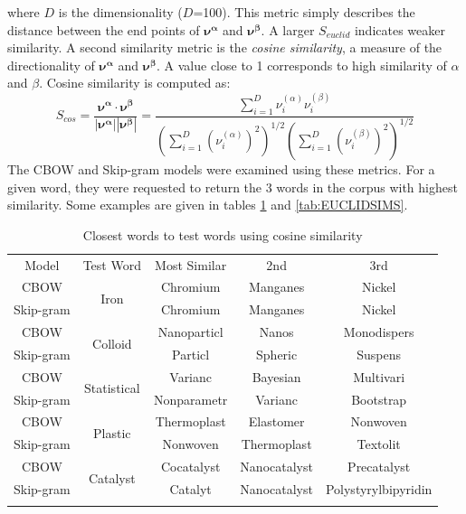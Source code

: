 where $D$ is the dimensionality ($D$=100). This metric simply describes the distance between the end points of $\mathbf{\nu^\alpha}$ and $\mathbf{\nu^\beta}$. A larger $S_{euclid}$ indicates weaker similarity. A second similarity metric is the \emph{cosine similarity}, a measure of the directionality of $\mathbf{\nu^\alpha}$ and $\mathbf{\nu^\beta}$. A value close to 1 corresponds to high similarity of $\alpha$ and $\beta$. Cosine similarity is computed as:
$$S_{cos}=\frac{\mathbf{\nu^\alpha} \cdot \mathbf{\nu^\beta}}{|\mathbf{\nu^\alpha}| |\mathbf{\nu^\beta}|} = \frac{\displaystyle\sum_{i=1}^{D} \nu^{(\alpha)}_{i}\nu^{(\beta)}_{i}}{\left(\displaystyle\sum_{i=1}^{D} (\nu^{(\alpha)}_{i})^2\right)^{1/2} \left(\displaystyle\sum_{i=1}^{D} (\nu^{(\beta)}_{i})^2\right)^{1/2}}
$$
The CBOW and Skip-gram models were examined using these metrics. For a given word, they were requested to return the 3 words in the corpus with highest similarity. Some examples are given in tables \ref{tab:COSINESIMS} and \ref{tab:EUCLIDSIMS}.
\begin{table}[h!]
\begin{center}
\caption[Word similarity examinations with cosine similarity]{Closest words to test words using cosine similarity}
\label{tab:COSINESIMS}
\begin{tabular}{||c||c|c|c|c||}
\hline
Model     & Test Word              & Most Similar & 2nd & 3rd \\ \hhline{||=||=|=|=|=||}
CBOW      & \multirow{2}{*}{Iron} & Chromium             &  Manganes   &   Nickel  \\ \cline{1-1} \cline{3-5} 
Skip-gram &                   &  Chromium            &   Manganes  &  Nickel   \\ 
\hhline{||=||=|=|=|=||}
CBOW      & \multirow{2}{*}{Colloid} & Nanoparticl             &  Nanos   &   Monodispers  \\ \cline{1-1} \cline{3-5} 
Skip-gram &                   &  Particl            &   Spheric  &  Suspens   \\ 
\hhline{||=||=|=|=|=||}
CBOW      & \multirow{2}{*}{Statistical} & Varianc             &  Bayesian   &   Multivari  \\ \cline{1-1} \cline{3-5} 
Skip-gram &                   &  Nonparametr            &   Varianc  &  Bootstrap   \\ 
\hhline{||=||=|=|=|=||}
CBOW      & \multirow{2}{*}{Plastic} & Thermoplast             &  Elastomer   & Nonwoven    \\ \cline{1-1} \cline{3-5} 
Skip-gram &                   &  Nonwoven            &   Thermoplast  &  Textolit   \\ 
\hhline{||=||=|=|=|=||}
CBOW      & \multirow{2}{*}{Catalyst} & Cocatalyst             &  Nanocatalyst   & Precatalyst    \\ \cline{1-1} \cline{3-5} 
Skip-gram &                   &  Catalyt            &   Nanocatalyst  &  Polystyrylbipyridin   \\ 
\hhline{||=||=|=|=|=||}
\end{tabular}
\end{center}
\end{table}

